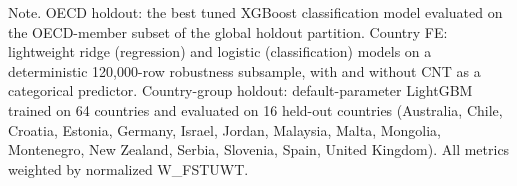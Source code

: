 \begin{table}[!t]
\centering
\small
\caption{Cross-context robustness: OECD-only holdout, country fixed-effects sensitivity, and country-group holdout evaluation\label{tab:country}}
\begin{tablenotes}
\item Note. OECD holdout: the best tuned XGBoost classification model evaluated on the OECD-member subset of the global holdout partition. Country FE: lightweight ridge (regression) and logistic (classification) models on a deterministic 120,000-row robustness subsample, with and without CNT as a categorical predictor. Country-group holdout: default-parameter LightGBM trained on 64 countries and evaluated on 16 held-out countries (Australia, Chile, Croatia, Estonia, Germany, Israel, Jordan, Malaysia, Malta, Mongolia, Montenegro, New Zealand, Serbia, Slovenia, Spain, United Kingdom). All metrics weighted by normalized W\_FSTUWT.
\end{tablenotes}
\end{table}
